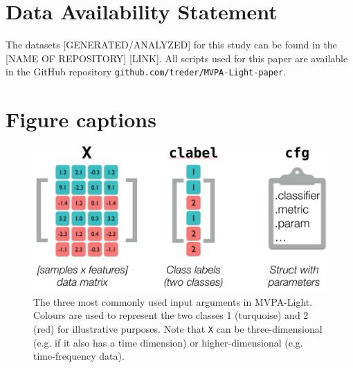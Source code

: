 \documentclass[utf8]{frontiersSCNS} %
\newcommand{\mvpa}{MVPA-Light}
\newcommand{\ttt}[1]{\texttt{#1}}
\begin{document}
\section*{Data Availability Statement}
The datasets [GENERATED/ANALYZED] for this study can be found in the [NAME OF REPOSITORY] [LINK]. All scripts used for this paper are available in the GitHub repository \texttt{github.com/treder/MVPA-Light-paper}.




\section*{Figure captions}


\begin{figure}[ht!]
\centering\includegraphics[width=.6\linewidth]{X_clabel_cfg}
\caption{The three most commonly used input arguments in \mvpa. Colours are used to represent the two classes 1 (turquoise) and 2 (red) for illustrative purposes. Note that \ttt{X} can be  three-dimensional (e.g. if it also has a time dimension) or higher-dimensional (e.g. time-frequency data).}\label{fig:X}
\end{figure}
\end{document}
